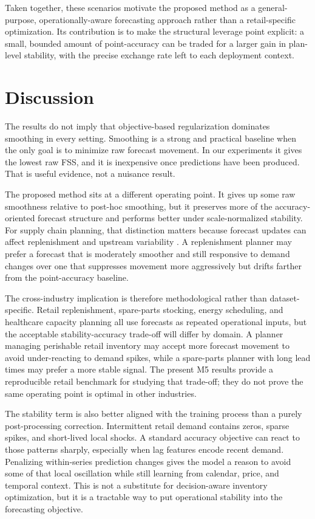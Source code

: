 \documentclass[10pt,conference]{IEEEtran}
\begin{document}
Taken together, these scenarios motivate the proposed method as a general-purpose, operationally-aware forecasting approach rather than a retail-specific optimization. Its contribution is to make the structural leverage point explicit: a small, bounded amount of point-accuracy can be traded for a larger gain in plan-level stability, with the precise exchange rate left to each deployment context.

\section{Discussion}
The results do not imply that objective-based regularization dominates smoothing in every setting. Smoothing is a strong and practical baseline when the only goal is to minimize raw forecast movement. In our experiments it gives the lowest raw FSS, and it is inexpensive once predictions have been produced. That is useful evidence, not a nuisance result.

The proposed method sits at a different operating point. It gives up some raw smoothness relative to post-hoc smoothing, but it preserves more of the accuracy-oriented forecast structure and performs better under scale-normalized stability. For supply chain planning, that distinction matters because forecast updates can affect replenishment and upstream variability \cite{lee1997bullwhip,chen2000bullwhip,zhang2004forecastingBullwhip}. A replenishment planner may prefer a forecast that is moderately smoother and still responsive to demand changes over one that suppresses movement more aggressively but drifts farther from the point-accuracy baseline.

The cross-industry implication is therefore methodological rather than dataset-specific. Retail replenishment, spare-parts stocking, energy scheduling, and healthcare capacity planning all use forecasts as repeated operational inputs, but the acceptable stability-accuracy trade-off will differ by domain. A planner managing perishable retail inventory may accept more forecast movement to avoid under-reacting to demand spikes, while a spare-parts planner with long lead times may prefer a more stable signal. The present M5 results provide a reproducible retail benchmark for studying that trade-off; they do not prove the same operating point is optimal in other industries.

The stability term is also better aligned with the training process than a purely post-processing correction. Intermittent retail demand contains zeros, sparse spikes, and short-lived local shocks. A standard accuracy objective can react to those patterns sharply, especially when lag features encode recent demand. Penalizing within-series prediction changes gives the model a reason to avoid some of that local oscillation while still learning from calendar, price, and temporal context. This is not a substitute for decision-aware inventory optimization, but it is a tractable way to put operational stability into the forecasting objective.
\end{document}
